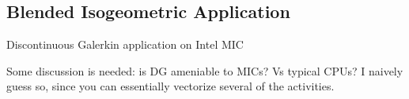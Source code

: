 \subsection{Blended Isogeometric Application}
\label{sec:isogeometric}

Discontinuous Galerkin application on Intel MIC


%
%


Some discussion is needed: is DG ameniable to MICs? Vs typical CPUs? I
naively guess so, since you can essentially vectorize several of the
activities.

